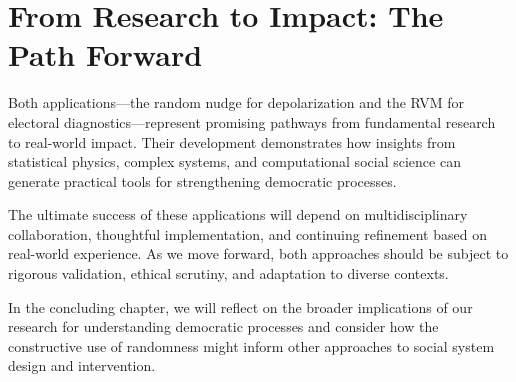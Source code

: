 \section{From Research to Impact: The Path Forward}

Both applications—the random nudge for depolarization and the RVM for electoral diagnostics—represent promising pathways from fundamental research to real-world impact. Their development demonstrates how insights from statistical physics, complex systems, and computational social science can generate practical tools for strengthening democratic processes.

The ultimate success of these applications will depend on multidisciplinary collaboration, thoughtful implementation, and continuing refinement based on real-world experience. As we move forward, both approaches should be subject to rigorous validation, ethical scrutiny, and adaptation to diverse contexts.

In the concluding chapter, we will reflect on the broader implications of our research for understanding democratic processes and consider how the constructive use of randomness might inform other approaches to social system design and intervention. 